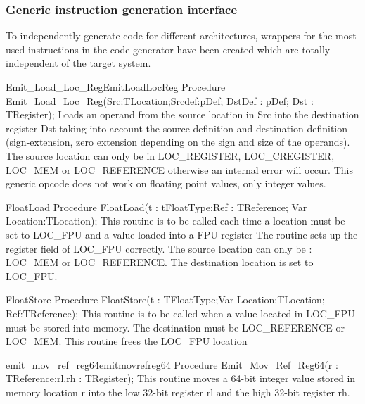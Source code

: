 \documentclass [a4paper,12pt]{article}
\begin{document}
\subsubsection{Generic instruction generation interface}
\label{subsubsec:generic}

To independently generate code for different architectures, wrappers for the
most used instructions in the code generator have been created which are
totally independent of the target system.

\begin{procedurel}{Emit\_Load\_Loc\_Reg}{EmitLoadLocReg}
\Declaration
Procedure Emit{\_}Load{\_}Loc{\_}Reg(Src:TLocation;Srcdef:pDef; DstDef : pDef; Dst : TRegister);
\Description
Loads an operand from the source location in \textsf{Src} into the
destination register \textsf{Dst} taking into account the source definition
and destination definition (sign-extension, zero extension depending on the
sign and size of the operands).
\Notes
The source location can only be in LOC{\_}REGISTER, LOC{\_}CREGISTER,
LOC{\_}MEM or LOC{\_}REFERENCE otherwise an internal error will occur. This
generic opcode does not work on floating point values, only integer values.
\end{procedurel}

\begin{procedure}{FloatLoad}
\Declaration
Procedure FloatLoad(t : tFloatType;Ref : TReference; Var Location:TLocation);
\Description
This routine is to be called each time a location must be set to LOC{\_}FPU
and a value loaded into a FPU register
\Notes
The routine sets up the register field of LOC{\_}FPU correctly. The source
location can only be : LOC{\_}MEM or LOC{\_}REFERENCE. The destination
location is set to LOC{\_}FPU.
\end{procedure}

\begin{function}{FloatStore}
\Declaration
Procedure FloatStore(t : TFloatType;Var Location:TLocation; Ref:TReference);
\Description
This routine is to be called when a value located in LOC{\_}FPU must be
stored into memory.
\Notes
The destination must be LOC{\_}REFERENCE or LOC{\_}MEM. This routine frees
the LOC{\_}FPU location \\
\end{function}

\begin{functionl}{emit{\_}mov{\_}ref{\_}reg64}{emitmovrefreg64}
\Declaration
Procedure Emit{\_}Mov{\_}Ref{\_}Reg64(r : TReference;rl,rh : TRegister);
\Description
This routine moves a 64-bit integer value stored in memory location
\textsf{r} into the low 32-bit register \textsf{rl} and the high 32-bit
register \textsf{rh}.
\end{functionl}
\end{document}
